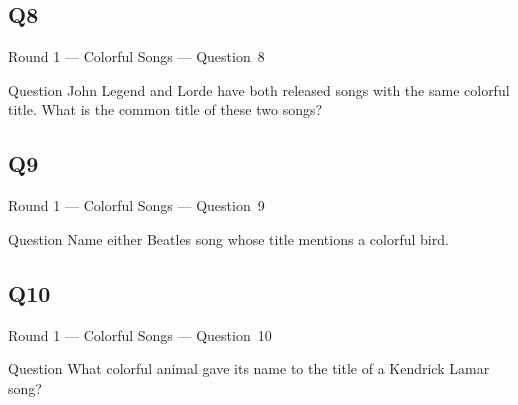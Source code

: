 \documentclass[11pt]{beamer}
\begin{document}
\subsection*{Q8}
\begin{frame}[t]{Round 1 --- Colorful Songs --- \mbox{Question 8}}
\vspace{-0.5em}
\begin{block}{Question}
John Legend and Lorde have both released songs with the same colorful title. What is the common title of these two songs?
\end{block}
\end{frame}
\subsection*{Q9}
\begin{frame}[t]{Round 1 --- Colorful Songs --- \mbox{Question 9}}
\vspace{-0.5em}
\begin{block}{Question}
Name either Beatles song whose title mentions a colorful bird.
\end{block}
\end{frame}
\subsection*{Q10}
\begin{frame}[t]{Round 1 --- Colorful Songs --- \mbox{Question 10}}
\vspace{-0.5em}
\begin{block}{Question}
What colorful animal gave its name to the title of a Kendrick Lamar song?
\end{block}
\end{frame}
\end{document}
